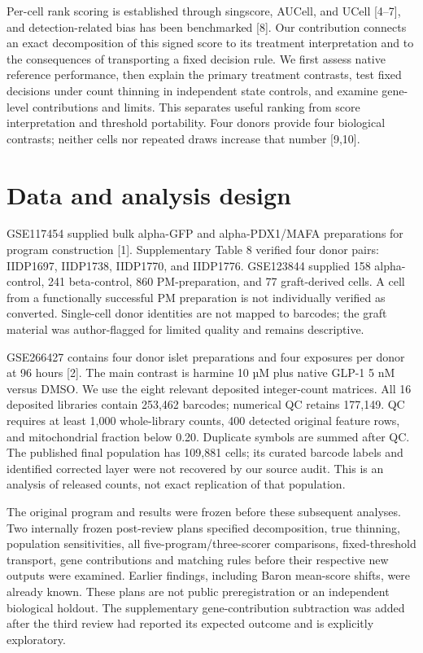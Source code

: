 \documentclass[11pt,letterpaper]{article}
\begin{document}
Per-cell rank scoring is established through singscore, AUCell, and UCell [4–7], and detection-related bias has been benchmarked [8]. Our contribution connects an exact decomposition of this signed score to its treatment interpretation and to the consequences of transporting a fixed decision rule. We first assess native reference performance, then explain the primary treatment contrasts, test fixed decisions under count thinning in independent state controls, and examine gene-level contributions and limits. This separates useful ranking from score interpretation and threshold portability. Four donors provide four biological contrasts; neither cells nor repeated draws increase that number [9,10].

\section*{Data and analysis design}
GSE117454 supplied bulk alpha-GFP and alpha-PDX1/MAFA preparations for program construction [1]. Supplementary Table 8 verified four donor pairs: IIDP1697, IIDP1738, IIDP1770, and IIDP1776. GSE123844 supplied 158 alpha-control, 241 beta-control, 860 PM-preparation, and 77 graft-derived cells. A cell from a functionally successful PM preparation is not individually verified as converted. Single-cell donor identities are not mapped to barcodes; the graft material was author-flagged for limited quality and remains descriptive.

GSE266427 contains four donor islet preparations and four exposures per donor at 96 hours [2]. The main contrast is harmine 10 µM plus native GLP-1 5 nM versus DMSO. We use the eight relevant deposited integer-count matrices. All 16 deposited libraries contain 253,462 barcodes; numerical QC retains 177,149. QC requires at least 1,000 whole-library counts, 400 detected original feature rows, and mitochondrial fraction below 0.20. Duplicate symbols are summed after QC. The published final population has 109,881 cells; its curated barcode labels and identified corrected layer were not recovered by our source audit. This is an analysis of released counts, not exact replication of that population.

The original program and results were frozen before these subsequent analyses. Two internally frozen post-review plans specified decomposition, true thinning, population sensitivities, all five-program/three-scorer comparisons, fixed-threshold transport, gene contributions and matching rules before their respective new outputs were examined. Earlier findings, including Baron mean-score shifts, were already known. These plans are not public preregistration or an independent biological holdout. The supplementary gene-contribution subtraction was added after the third review had reported its expected outcome and is explicitly exploratory.
\end{document}
